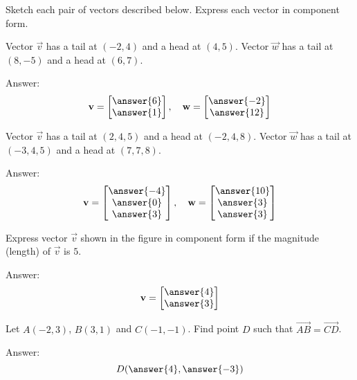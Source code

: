 \documentclass{ximera}
\begin{document}
\begin{problem}%
Sketch each pair of vectors described below.  Express each vector in component form. 
  \begin{problem}\label{prob:componentform1}
Vector $\vec{v}$ has a tail at $(-2,4)$ and a head at $(4,5)$. Vector $\vec{w}$ has a tail at $(8,-5)$ and a head at $(6,7)$.

Answer:
$$\vec{v}=\begin{bmatrix}\answer{6}\\ \answer{1}\end{bmatrix},\quad\vec{w}=\begin{bmatrix}\answer{-2}\\ \answer{12}\end{bmatrix}$$
\end{problem}

\begin{problem}\label{prob:componentform2}
 Vector $\vec{v}$ has a tail at $(2,4,5)$ and a head at $(-2,4,8)$. Vector $\vec{w}$ has a tail at $(-3,4,5)$ and a head at $(7,7,8)$.
 
 Answer:
 $$\vec{v}=\begin{bmatrix}\answer{-4}\\\answer{0}\\\answer{3}\end{bmatrix},\quad\vec{w}=\begin{bmatrix}\answer{10}\\\answer{3}\\\answer{3}\end{bmatrix}$$
 \end{problem}
  \end{problem}

\begin{problem}\label{prob:compformgivenlength}
Express vector $\vec{v}$ shown in the figure  in component form if the magnitude (length) of $\vec{v}$ is $5$.

\begin{center}
\end{center}

Answer:
$$\vec{v}=\begin{bmatrix}\answer{4}\\\answer{3}\end{bmatrix}$$
\end{problem}

\begin{problem}\label{prob:compformpractice} Let $A(-2, 3)$, $B(3, 1)$ and $C(-1, -1)$.  Find point $D$ such that $\overrightarrow{AB}=\overrightarrow{CD}$.

Answer:
$$D(\answer{4}, \answer{-3})$$
\end{problem}
\end{document}
